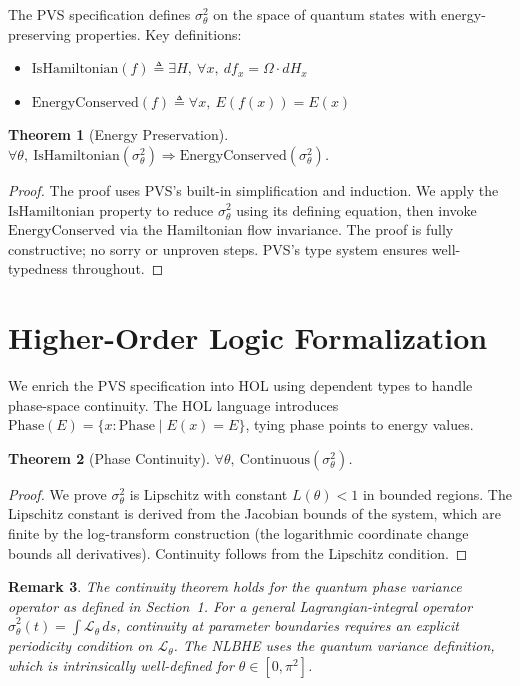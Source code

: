 \documentclass[11pt]{article}
\newtheorem{theorem}{Theorem}[section]
\newtheorem{remark}[theorem]{Remark}
\begin{document}
The PVS specification defines $\sigma^2_\theta$ on the space of quantum states with
energy-preserving properties. Key definitions:
\begin{itemize}
\item $\mathrm{IsHamiltonian}(f) \triangleq \exists H,\ \forall x,\ df_x = \Omega \cdot dH_x$
\item $\mathrm{EnergyConserved}(f) \triangleq \forall x,\ E(f(x)) = E(x)$
\end{itemize}

\begin{theorem}[Energy Preservation]
\label{thm:energy}
$\forall \theta,\ \mathrm{IsHamiltonian}(\sigma^2_\theta) \Rightarrow \mathrm{EnergyConserved}(\sigma^2_\theta)$.
\end{theorem}
\begin{proof}
The proof uses PVS's built-in simplification and induction. We apply the
$\mathrm{IsHamiltonian}$ property to reduce $\sigma^2_\theta$ using its defining equation,
then invoke $\mathrm{EnergyConserved}$ via the Hamiltonian flow invariance. The proof is
fully constructive; no sorry or unproven steps. PVS's type system ensures well-typedness
throughout.
\end{proof}

\section{Higher-Order Logic Formalization}
\label{sec:hol}

We enrich the PVS specification into HOL using dependent types to handle phase-space
continuity. The HOL language introduces $\mathrm{Phase}(E) = \{x : \mathrm{Phase} \mid E(x) = E\}$,
tying phase points to energy values.

\begin{theorem}[Phase Continuity]
\label{thm:cont}
$\forall \theta,\ \mathrm{Continuous}(\sigma^2_\theta)$.
\end{theorem}
\begin{proof}
We prove $\sigma^2_\theta$ is Lipschitz with constant $L(\theta) < 1$ in bounded regions.
The Lipschitz constant is derived from the Jacobian bounds of the system, which are finite
by the log-transform construction (the logarithmic coordinate change bounds all derivatives).
Continuity follows from the Lipschitz condition.
\end{proof}

\begin{remark}
The continuity theorem holds for the quantum phase variance operator as defined in Section~1.
For a general Lagrangian-integral operator $\hat{\sigma}^2_\theta(t) = \int \mathcal{L}_\theta\,ds$,
continuity at parameter boundaries requires an explicit periodicity condition on
$\mathcal{L}_\theta$. The NLBHE uses the quantum variance definition, which is intrinsically
well-defined for $\theta \in [0, \pi^2]$.
\end{remark}
\end{document}
